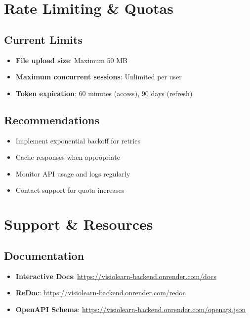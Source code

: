 \documentclass[12pt,a4paper,oneside]{article}
\begin{document}
\section{Rate Limiting \& Quotas}

\subsection{Current Limits}

\begin{itemize}
    \item \textbf{File upload size}: Maximum 50 MB
    \item \textbf{Maximum concurrent sessions}: Unlimited per user
    \item \textbf{Token expiration}: 60 minutes (access), 90 days (refresh)
\end{itemize}

\subsection{Recommendations}

\begin{itemize}
    \item Implement exponential backoff for retries
    \item Cache responses when appropriate
    \item Monitor API usage and logs regularly
    \item Contact support for quota increases
\end{itemize}

\section{Support \& Resources}

\subsection{Documentation}

\begin{itemize}
    \item \textbf{Interactive Docs}: \url{https://visiolearn-backend.onrender.com/docs}
    \item \textbf{ReDoc}: \url{https://visiolearn-backend.onrender.com/redoc}
    \item \textbf{OpenAPI Schema}: \url{https://visiolearn-backend.onrender.com/openapi.json}
\end{itemize}
\end{document}
